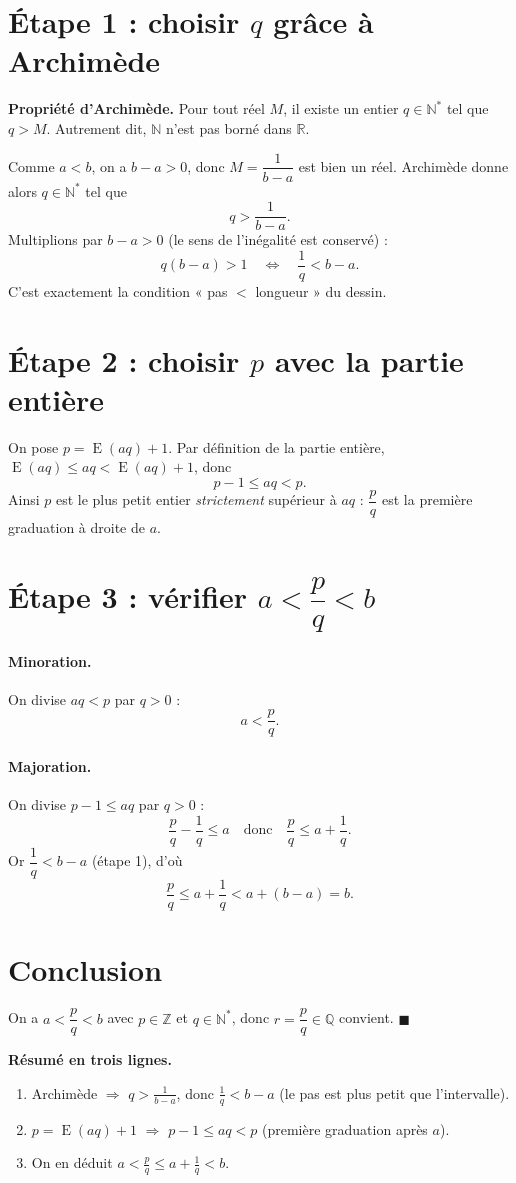 \documentclass[11pt,a4paper]{article}
\newcommand{\E}{\operatorname{E}}
\newcommand{\Q}{\mathbb{Q}}
\newcommand{\N}{\mathbb{N}}
\newcommand{\Z}{\mathbb{Z}}
\newcommand{\R}{\mathbb{R}}
\begin{document}
\section{Étape 1 : choisir $q$ grâce à Archimède}

\begin{attention}
\textbf{Propriété d'Archimède.} Pour tout réel $M$, il existe un entier $q\in\N^*$ tel que $q>M$. Autrement dit, $\N$ n'est pas borné dans $\R$.
\end{attention}

Comme $a<b$, on a $b-a>0$, donc $M=\dfrac{1}{b-a}$ est bien un réel. Archimède donne alors $q\in\N^*$ tel que
\[
q>\frac{1}{b-a}.
\]
Multiplions par $b-a>0$ (le sens de l'inégalité est conservé) :
\[
q(b-a)>1
\quad\Longleftrightarrow\quad
\boxed{\frac1q<b-a}.
\]
C'est exactement la condition « pas $<$ longueur » du dessin.

\section{Étape 2 : choisir $p$ avec la partie entière}

On pose $p=\E(aq)+1$. Par définition de la partie entière, $\E(aq)\le aq<\E(aq)+1$, donc
\[
\boxed{p-1\le aq<p}.
\]
Ainsi $p$ est le plus petit entier \emph{strictement} supérieur à $aq$ : $\dfrac{p}{q}$ est la première graduation à droite de $a$.

\section{Étape 3 : vérifier $a<\dfrac pq<b$}

\paragraph{Minoration.} On divise $aq<p$ par $q>0$ :
\[
a<\frac pq.
\]

\paragraph{Majoration.} On divise $p-1\le aq$ par $q>0$ :
\[
\frac pq-\frac1q\le a
\quad\text{donc}\quad
\frac pq\le a+\frac1q.
\]
Or $\dfrac1q<b-a$ (étape 1), d'où
\[
\frac pq\le a+\frac1q<a+(b-a)=b.
\]

\section{Conclusion}

On a $a<\dfrac pq<b$ avec $p\in\Z$ et $q\in\N^*$, donc $r=\dfrac pq\in\Q$ convient. \hfill$\blacksquare$

\bigskip
\noindent\textbf{Résumé en trois lignes.}
\begin{enumerate}
  \item Archimède $\Rightarrow$ $q>\frac1{b-a}$, donc $\frac1q<b-a$ (le pas est plus petit que l'intervalle).
  \item $p=\E(aq)+1$ $\Rightarrow$ $p-1\le aq<p$ (première graduation après $a$).
  \item On en déduit $a<\frac pq\le a+\frac1q<b$.
\end{enumerate}
\end{document}
